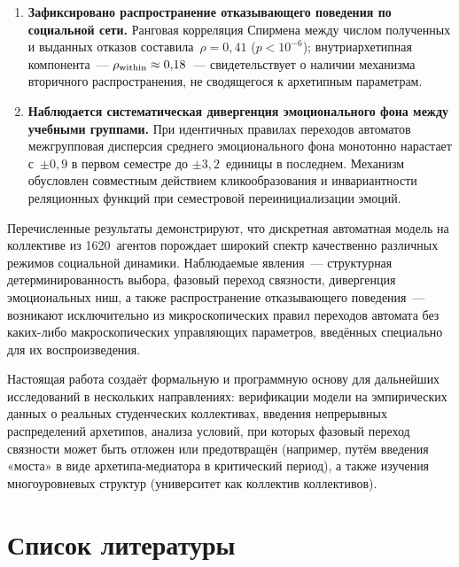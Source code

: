 \documentclass[12pt]{article}
\begin{document}
\begin{enumerate}
    \item \textbf{Зафиксировано распространение отказывающего
          поведения по социальной сети.}
          Ранговая корреляция Спирмена между числом полученных и
          выданных отказов составила~$\rho = 0{,}41$
          ($p < 10^{-6}$); внутриархетипная компонента~---
          $\rho_{\rm within} \approx 0{,}18$~--- свидетельствует о
          наличии механизма вторичного распространения, не
          сводящегося к архетипным параметрам.

    \item \textbf{Наблюдается систематическая дивергенция эмоционального
          фона между учебными группами.}
          При идентичных правилах переходов автоматов межгрупповая
          дисперсия среднего эмоционального фона монотонно
          нарастает с~$\pm 0{,}9$ в первом семестре до
          $\pm 3{,}2$~единицы в последнем.
          Механизм обусловлен совместным действием кликообразования
          и инвариантности реляционных функций при семестровой
          переинициализации эмоций.

\end{enumerate}

Перечисленные результаты демонстрируют, что дискретная автоматная
модель на коллективе из 1620~агентов порождает широкий спектр
качественно различных режимов социальной динамики.
Наблюдаемые явления~--- структурная детерминированность выбора,
фазовый переход связности, дивергенция эмоциональных ниш, а также
распространение отказывающего поведения~--- возникают исключительно
из микроскопических правил переходов автомата без каких-либо
макроскопических управляющих параметров, введённых специально
для их воспроизведения.

Настоящая работа создаёт формальную и программную основу для
дальнейших исследований в нескольких направлениях:
верификации модели на эмпирических данных о реальных студенческих
коллективах, введения непрерывных распределений архетипов,
анализа условий, при которых фазовый переход связности может
быть отложен или предотвращён (например, путём введения
«моста» в виде архетипа-медиатора в критический период),
а также изучения многоуровневых структур (университет как
коллектив коллективов).

\clearpage
\section{Список литературы}
\end{document}
